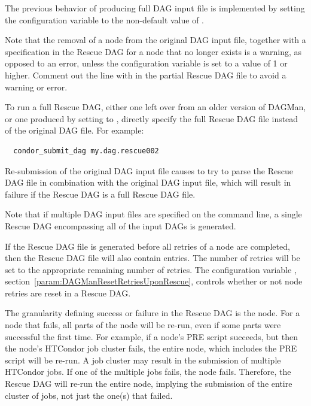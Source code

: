 The previous behavior of producing full DAG input file 
is implemented by setting the configuration variable
 to the non-default 
value of .  

Note that the removal of a node from the original DAG input file, 
together with a  specification in the Rescue DAG 
for a node that no longer exists is a warning,
as opposed to an error, 
unless the  configuration
variable is set to a value of 1 or higher.  
Comment out the line with  in the partial Rescue DAG file
to avoid a warning or error.

To run a full Rescue DAG,
either one left over from an older version of DAGMan, 
or one produced by setting  
to , 
directly specify the full Rescue DAG file instead of the original DAG file.
For example:

\begin{verbatim}
  condor_submit_dag my.dag.rescue002
\end{verbatim}

Re-submission of the original DAG input file causes  to try to
parse the Rescue DAG file in combination with the original DAG input file, 
which will result in failure if the Rescue DAG is a full Rescue DAG file.

Note that if multiple DAG input files are specified on the
 command line,
a single Rescue DAG encompassing all of the input DAGs is generated.

If the Rescue DAG file is generated before all retries
of a node are completed, 
then the Rescue DAG file will also contain  entries.
The number of retries will be set to the appropriate remaining
number of retries.
The configuration variable , 
section~\ref{param:DAGManResetRetriesUponRescue},
controls whether or not node retries are reset in a Rescue DAG.

The granularity defining success or failure
in the Rescue DAG is the node.
For a node that fails,
all parts of the node will be re-run,
even if some parts were successful the first time.
For example, if a node's PRE script
succeeds, but then the node's HTCondor job cluster fails,
the entire node, which includes the PRE script will be re-run.
A job cluster may result in the submission of multiple HTCondor jobs.
If one of the multiple jobs fails, the node fails.
Therefore, the Rescue DAG will
re-run the entire node,
implying the submission of the entire cluster of jobs,
not just the one(s) that failed.

